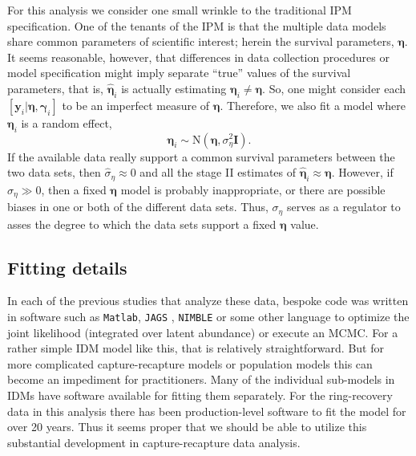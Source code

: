 \documentclass[12pt]{article}
\newcommand{\by}{\mathbf{y}}
\newcommand{\bn}{\boldsymbol{\eta}}
\newcommand{\bg}{\boldsymbol{\gamma}}
\newcommand{\tN}{\text{N}}
\newcommand{\bI}{\mathbf{I}}
\begin{document}
For this analysis we consider one small wrinkle to the traditional IPM specification. One of the tenants of the IPM is that the multiple data models share common parameters of scientific interest; herein the survival parameters, $\bn$. It seems reasonable, however, that differences in data collection procedures or model specification might imply separate ``true'' values of the survival parameters, that is, $\hat{\bn}_i$ is actually estimating $\bn_i\ne\bn$. So, one might consider each $[\by_i|\bn,\bg_i]$ to be an imperfect measure of $\bn$. Therefore, we also fit a model where $\bn_i$ is a random effect, 
\[
\bn_i \sim \tN(\bn, \sigma^2_\eta\bI).
\]
If the available data really support a common survival parameters between the two data sets, then $\hat{\sigma}_\eta \approx 0$ and all the stage II estimates of $\hat{\bn}_i \approx \bn$. However, if $\sigma_\eta \gg 0$, then a fixed $\bn$ model is probably inappropriate, or there are possible biases in one or both of the different data sets. Thus, $\sigma_\eta$ serves as a regulator to asses the degree to which the data sets support a fixed $\bn$ value.

\subsection{Fitting details}
 
In each of the previous studies that analyze these data, bespoke code was written in software such as {\tt Matlab}, {\tt JAGS} \citep{plummer2003jags}, {\tt NIMBLE} \citep{de2017programming} or some other language to optimize the joint likelihood (integrated over latent abundance) or execute an MCMC. For a rather simple IDM model like this, that is relatively straightforward. But for more complicated capture-recapture models or population models this can become an impediment for practitioners. Many of the individual sub-models in IDMs have software available for fitting them separately. For the ring-recovery data in this analysis there has been production-level software to fit the model for over 20 years. Thus it seems proper that we should be able to utilize this substantial development in capture-recapture data analysis. 
\end{document}
